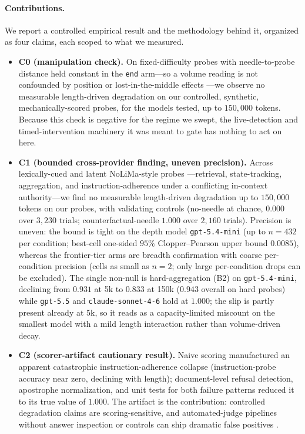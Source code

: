 \documentclass[11pt]{article}
\begin{document}
\paragraph{Contributions.} We report a controlled empirical result and the methodology behind it, organized as four claims, each scoped to what we measured.
\begin{itemize}
  \item \textbf{C0 (manipulation check).} On fixed-difficulty probes with needle-to-probe distance held constant in the \texttt{end} arm---so a volume reading is not confounded by position or lost-in-the-middle effects \cite{liu2024lostmiddle}---we observe no measurable length-driven degradation on our controlled, synthetic, mechanically-scored probes, for the models tested, up to $150{,}000$ tokens. Because this check is negative for the regime we swept, the live-detection and timed-intervention machinery it was meant to gate has nothing to act on here.
  \item \textbf{C1 (bounded cross-provider finding, uneven precision).} Across lexically-cued and latent NoLiMa-style probes \cite{modarressi2025nolima}---retrieval, state-tracking, aggregation, and instruction-adherence under a conflicting in-context authority---we find no measurable length-driven degradation up to $150{,}000$ tokens on our probes, with validating controls (no-needle at chance, $0.000$ over $3{,}230$ trials; counterfactual-needle $1.000$ over $2{,}160$ trials). Precision is uneven: the bound is tight on the depth model \texttt{gpt-5.4-mini} (up to $n=432$ per condition; best-cell one-sided $95\%$ Clopper--Pearson upper bound $0.0085$), whereas the frontier-tier arms are breadth confirmation with coarse per-condition precision (cells as small as $n=2$; only large per-condition drops can be excluded). The single non-null is hard-aggregation (B2) on \texttt{gpt-5.4-mini}, declining from $0.931$ at 5k to $0.833$ at 150k ($0.943$ overall on hard probes) while \texttt{gpt-5.5} and \texttt{claude-sonnet-4-6} hold at $1.000$; the slip is partly present already at 5k, so it reads as a capacity-limited miscount on the smallest model with a mild length interaction rather than volume-driven decay.
  \item \textbf{C2 (scorer-artifact cautionary result).} Naive scoring manufactured an apparent catastrophic instruction-adherence collapse (instruction-probe accuracy near zero, declining with length); document-level refusal detection, apostrophe normalization, and unit tests for both failure patterns reduced it to its true value of $1.000$. The artifact is the contribution: controlled degradation claims are scoring-sensitive, and automated-judge pipelines without answer inspection or controls can ship dramatic false positives \cite{zheng2023judge}.

\end{itemize}
\end{document}
